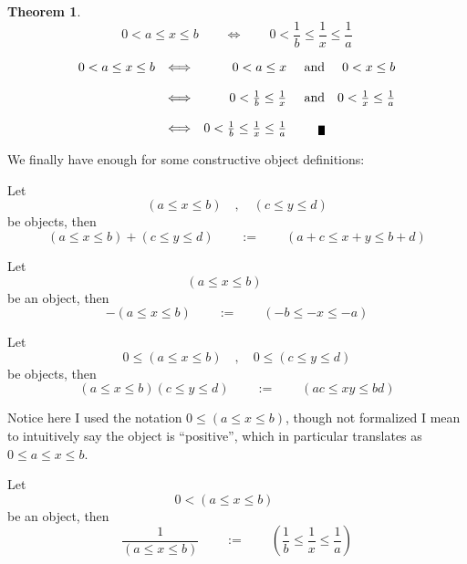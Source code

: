 \documentclass[twoside]{article}
\newtheorem{theorem}{Theorem}[section]
\newenvironment{proof}[1][Proof]{\begin{trivlist}
\item[\hskip \labelsep {\bfseries #1}]}{\end{trivlist}}
\newenvironment{definition}[1][Definition]{\begin{trivlist}
\item[\hskip \labelsep {\bfseries Definition (#1):}]}{\end{trivlist}}
\newcommand{\qed}{\nobreak \ifvmode \relax \else
      \ifdim\lastskip<1.5em \hskip-\lastskip
      \hskip1.5em plus0em minus0.5em \fi \nobreak
      \vrule height0.5em width0.5em depth0.25em\fi}
\begin{document}
\begin{theorem}
\color{blue}
$$ 0 < a\le x\le b\qquad\Longleftrightarrow\qquad 0 < \frac{1}{b}\le\frac{1}{x}\le\frac{1}{a} $$
\end{theorem}

\begin{proof}
$$ \begin{array}{lcrrr}
0 < a\le x\le b	&	\Longleftrightarrow	&	0 < a\le x	&	\mbox{and}	&	0 < x\le b		\\
		&				&			&			&				\\
		&	\Longleftrightarrow	&	0 < \frac{1}{b}\le\frac{1}{x}	&	\mbox{and}	&	0 < \frac{1}{x}\le\frac{1}{a}		\\
		&				&			&			&				\\
		&	\Longleftrightarrow	&	0 < \frac{1}{b}\le\frac{1}{x}\le\frac{1}{a}	&	\qed	\\
\end{array} $$
\end{proof}

We finally have enough for some constructive object definitions:

\begin{definition}[additive object]
Let $$ (a\le x\le b)\quad ,\quad (c\le y\le d) $$
be objects, then $$ (a\le x\le b)+(c\le y\le d)\qquad :=\qquad (a+c\le x+y\le b+d) $$
\end{definition}

\begin{definition}[additive inverse object]
Let $$ (a\le x\le b)\qquad $$ be an object, then $$ -(a\le x\le b)\qquad :=\qquad (-b\le -x\le -a) $$
\end{definition}

\begin{definition}[multiplicative object]
Let $$ 0\le(a\le x\le b)\quad ,\quad 0\le(c\le y\le d) $$
be objects, then $$ (a\le x\le b)(c\le y\le d)\qquad :=\qquad (ac\le xy\le bd) $$
\end{definition}

Notice here I used the notation $ 0\le(a\le x\le b) $, though not formalized I mean to intuitively say the object is ``positive'',
which in particular translates as $ 0\le a\le x\le b $.

\begin{definition}[multiplicative inverse object]
Let $$ 0<(a\le x\le b)\qquad $$ be an object, then $$ \frac{1}{(a\le x\le b)}\qquad :=\qquad (\frac{1}{b}\le\frac{1}{x}\le\frac{1}{a}) $$
\end{definition}
\end{document}
